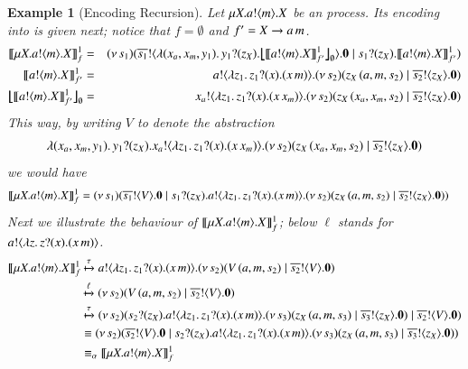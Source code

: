 \documentclass[preprint,11pt]{elsarticle}
\newtheorem{example}{Example}[section]
\begin{document}
{{\newpage
%
\begin{example}[Encoding Recursion]
Let $\mu X. a ! \langle m \rangle . X$ be an \HOp process.
Its encoding into \HO is given next; notice that $f = \emptyset$ and $f' = X \rightarrow a\,m$.
\begin{eqnarray*}
	\pmapp{\recp{X}{\bout{a}{m} \varp{X}}}{1}{f} &=&
	\newsp{s_1}{ 
	\bout{\dual{s_1}}{ \abs{(x_a, x_m, y_1)} \binp{y_1}{z_X} \auxmapp{\pmapp{\bout{a}{m} \varp{X}}{1}{{f'}}}{{}}{\es} } \inact 
	\Par
	\binp{s_1}{z_X} \pmapp{\bout{a}{m} \varp{X}}{1}{{f'}} 
	}
	\\
\pmapp{\bout{a}{m} \varp{X}}{1}{{ f'}} &=&
	\bout{a}{\abs{z_1}{\binp{z_1}{x} (\appl{x}{m})}} 
	\newsp{s_2}{\appl{z_X}{(a, m, s_2)}  
	\Par 
	\bout{\dual{s_2}}{ z_X} \inact} 
	\\
	\auxmapp{\pmapp{\bout{a}{m} \varp{X}}{1}{{f'}}}{{}}{\es}
	  & = & 
	\bout{x_a}{\abs{z_1}{\binp{z_1}{x} (\appl{x}{x_m})}} 
	\newsp{s_2}{\appl{z_X}{(x_a, x_m, s_2)}  
	\Par 
	\bout{\dual{s_2}}{ z_X} \inact} 
\end{eqnarray*}
This way, by writing $V$ to denote the abstraction
$$
\lambda (x_a, x_m, y_1).\,y_1 ? (z_X) . x_a ! \langle \lambda z_1.\,z_1 ? (x) . (x\, {x_m}) \rangle . (\nu\, s_2)(z_X\, {(x_a,x_m, s_2)}   \;|\;  \overline{s_2} ! \langle z_X \rangle . \mathbf{0})
$$
we would have %
\begin{align*}
\llbracket\mu X. a ! \langle m \rangle . X\rrbracket^1_f & =  (\nu\, s_1)( 
	\overline{s_1} ! \langle  V \rangle . \mathbf{0} 
	\;|\;
	s_1 ? (z_X) . 
	a ! \langle \lambda z_1.\,z_1 ? (x) . (x\, {m}) \rangle . 
	(\nu\, s_2)(z_X\, {(a, m, s_2)}  
	\;|\; 
	\overline{s_2} ! \langle  z_X \rangle . \mathbf{0}) 
	)
\end{align*}
Next we illustrate the behaviour of $\llbracket\mu X. a ! \langle m \rangle . X\rrbracket^1_f$; below $\ell$ stands for $a ! \langle \lambda z.\,z ? (x) . (x\, {m}) \rangle$.
\begin{align*}
\llbracket\mu X. a ! \langle m \rangle . X\rrbracket^1_f 
& \xmapsto{\tau}   
a ! \langle \lambda z_1.\,z_1 ? (x) . (x\, {m}) \rangle . 
	(\nu\, s_2)(V\, {(a, m, s_2)}  
	\;|\; 
	\overline{s_2} ! \langle V \rangle . \mathbf{0})
	\\
	& \xmapsto{\ell}
	(\nu\, s_2)(V\, {(a, m, s_2)}  	\;|\; 	\overline{s_2} ! \langle V \rangle . \mathbf{0})
\\
& \xmapsto{\tau} 
(\nu\, s_2)(
	s_2 ? (z_X) . a ! \langle \lambda z_1.\,z_1 ? (x) . (x\, {m}) \rangle . (\nu\, s_3)(z_X\, {(a,m, s_3)}   \;|\;  \overline{s_3} ! \langle z_X \rangle . \mathbf{0})  	
	\;|\; 	
	\overline{s_2} ! \langle V \rangle . \mathbf{0})
\\
& \equiv
(\nu\, s_2)(
\overline{s_2} ! \langle V \rangle . \mathbf{0}
	\;|\;
	s_2 ? (z_X) . a ! \langle \lambda z_1.\,z_1 ? (x) . (x\, {m}) \rangle . (\nu\, s_3)(z_X\, {(a,m, s_3)}   \;|\;  \overline{s_3} ! \langle z_X \rangle . \mathbf{0})  	
	)
	\\
	& \equiv_\alpha 
	\llbracket\mu X. a ! \langle m \rangle . X\rrbracket^1_f 
\end{align*}
\end{example}


}}
\end{document}
